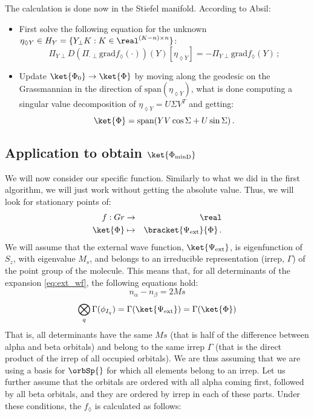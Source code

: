 \documentclass[a4paper,11pt]{article}
\begin{document}
The calculation is done now in the Stiefel manifold.
According to Absil:
\begin{itemize}
\item First solve the following equation for the unknown $\eta_{\lozenge Y} \in H_Y = \{Y_\perp K:K \in \real^{(K-n)\times n}\}$:
  \begin{equation}\label{eq:Absil_main_eq}
    \Pi_{Y\perp} D\left(\Pi_{\cdot{} \perp} \text{grad}f_\lozenge\left(\cdot{}\right) \right)
    \left(Y\right)\left[\eta_{\lozenge Y}\right] = -\Pi_{Y\perp}\text{grad}f_\lozenge\left(Y\right)\,;
  \end{equation}
\item Update $\ket{\Phi_0} \to \ket{\Phi}$ by moving along the geodesic on the Grassmannian in the direction of $\text{span}(\eta_{\lozenge Y})$, what is done computing a singular value decomposition of $\eta_{\lozenge Y} = U \Sigma V^T$ and getting:
  \begin{equation}
    \ket{\Phi} = \text{span}(Y V \cos \Sigma + U \sin \Sigma)\,.
  \end{equation}
\end{itemize}

\subsection{Application to obtain $\ket{\Phi_\text{minD}}$}

We will now consider our specific function.
Similarly to what we did in the first algorithm, we will just work without getting the absolute value.
Thus, we will look for stationary points of:
\begin{eqnarray}
  f : Gr &\to& \real\\
  \ket{\Phi} &\mapsto& \bracket{\Psi_\text{ext}}{\Phi}\,.
\end{eqnarray}
We will assume that the external wave function, $\ket{\Psi_\text{ext}}$, is eigenfunction of $S_z$, with eigenvalue $M_s$, and belongs to an irreducible representation (irrep, $\Gamma$) of the point group of the molecule.
This means that, for all determinants of the expansion \ref{eq:ext_wf}, the following equations hold:
\begin{equation}
  n_\alpha - n_\beta = 2 Ms
\end{equation}
\begin{equation}\label{eq:irrep_condition}
  \bigotimes_q \Gamma(\phi_{I_q}) = \Gamma(\ket{\Psi_\text{ext}}) = \Gamma(\ket{\Phi})
\end{equation}
That is, all determinants have the same $Ms$ (that is half of the difference between alpha and beta orbitals) and belong to the same irrep $\Gamma$ (that is the direct product of the irrep of all occupied orbitals).
We are thus assuming that we are using a basis for $\orbSp{}$ for which all elements belong to an irrep.
Let us further assume that the orbitals are ordered with all alpha coming first, followed by all beta orbitals, and they are ordered by irrep in each of these parts.
Under these conditions, the $f_\lozenge$ is calculated as follows:
\end{document}
